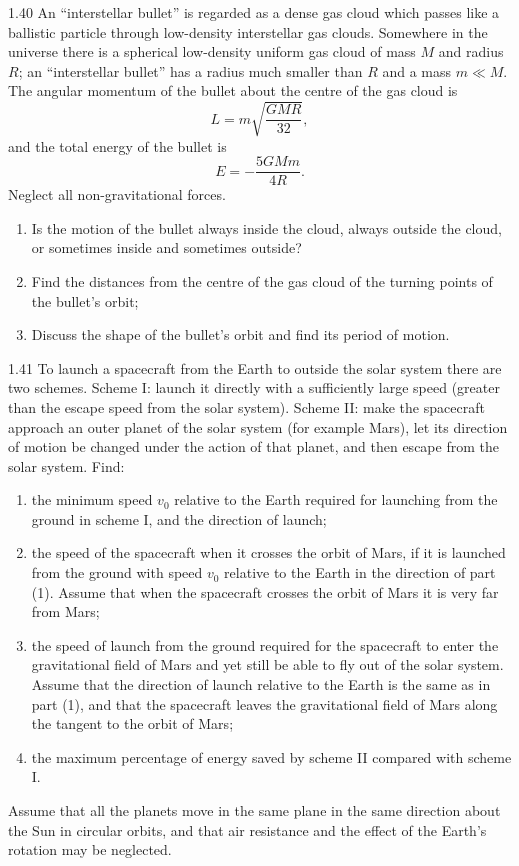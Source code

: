 \begin{problem}{1.40}
An ``interstellar bullet'' is regarded as a dense gas cloud which passes like a ballistic particle through low-density interstellar gas clouds. Somewhere in the universe there is a spherical low-density uniform gas cloud of mass $M$ and radius $R$; an ``interstellar bullet'' has a radius much smaller than $R$ and a mass $m\ll M$. The angular momentum of the bullet about the centre of the gas cloud is
\[
L=m\sqrt{\frac{GMR}{32}},
\]
and the total energy of the bullet is
\[
E=-\frac{5GMm}{4R}.
\]
Neglect all non-gravitational forces.
\begin{enumerate}[label=(\arabic*),leftmargin=2.2em,itemsep=1pt,topsep=2pt]
\item Is the motion of the bullet always inside the cloud, always outside the cloud, or sometimes inside and sometimes outside?
\item Find the distances from the centre of the gas cloud of the turning points of the bullet's orbit;
\item Discuss the shape of the bullet's orbit and find its period of motion.
\end{enumerate}
\end{problem}

\begin{problem}{1.41}
To launch a spacecraft from the Earth to outside the solar system there are two schemes. Scheme I: launch it directly with a sufficiently large speed (greater than the escape speed from the solar system). Scheme II: make the spacecraft approach an outer planet of the solar system (for example Mars), let its direction of motion be changed under the action of that planet, and then escape from the solar system. Find:
\begin{enumerate}[label=(\arabic*),leftmargin=2.2em,itemsep=1pt,topsep=2pt]
\item the minimum speed $v_0$ relative to the Earth required for launching from the ground in scheme I, and the direction of launch;
\item the speed of the spacecraft when it crosses the orbit of Mars, if it is launched from the ground with speed $v_0$ relative to the Earth in the direction of part (1). Assume that when the spacecraft crosses the orbit of Mars it is very far from Mars;
\item the speed of launch from the ground required for the spacecraft to enter the gravitational field of Mars and yet still be able to fly out of the solar system. Assume that the direction of launch relative to the Earth is the same as in part (1), and that the spacecraft leaves the gravitational field of Mars along the tangent to the orbit of Mars;
\item the maximum percentage of energy saved by scheme II compared with scheme I.
\end{enumerate}
Assume that all the planets move in the same plane in the same direction about the Sun in circular orbits, and that air resistance and the effect of the Earth's rotation may be neglected.
\end{problem}

